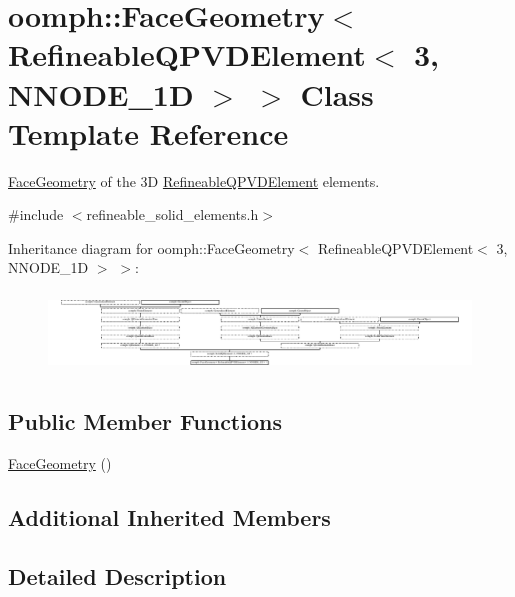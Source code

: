 \hypertarget{classoomph_1_1FaceGeometry_3_01RefineableQPVDElement_3_013_00_01NNODE__1D_01_4_01_4}{}\section{oomph\+:\+:Face\+Geometry$<$ Refineable\+Q\+P\+V\+D\+Element$<$ 3, N\+N\+O\+D\+E\+\_\+1D $>$ $>$ Class Template Reference}
\label{classoomph_1_1FaceGeometry_3_01RefineableQPVDElement_3_013_00_01NNODE__1D_01_4_01_4}


\hyperlink{classoomph_1_1FaceGeometry}{Face\+Geometry} of the 3D \hyperlink{classoomph_1_1RefineableQPVDElement}{Refineable\+Q\+P\+V\+D\+Element} elements.  




{\ttfamily \#include $<$refineable\+\_\+solid\+\_\+elements.\+h$>$}

Inheritance diagram for oomph\+:\+:Face\+Geometry$<$ Refineable\+Q\+P\+V\+D\+Element$<$ 3, N\+N\+O\+D\+E\+\_\+1D $>$ $>$\+:\begin{figure}[H]
\begin{center}
\leavevmode
\includegraphics[height=2.143541cm]{classoomph_1_1FaceGeometry_3_01RefineableQPVDElement_3_013_00_01NNODE__1D_01_4_01_4}
\end{center}
\end{figure}
\subsection*{Public Member Functions}
\begin{DoxyCompactItemize}
\item 
\hyperlink{classoomph_1_1FaceGeometry_3_01RefineableQPVDElement_3_013_00_01NNODE__1D_01_4_01_4_ae14ce49ee4b173d33978ab676faf0ed2}{Face\+Geometry} ()
\end{DoxyCompactItemize}
\subsection*{Additional Inherited Members}


\subsection{Detailed Description}
